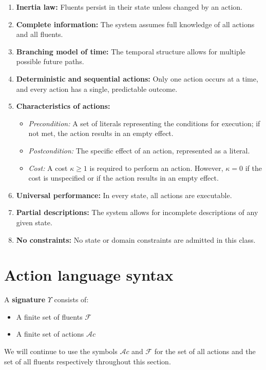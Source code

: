 \documentclass[11pt]{article}
\newcommand{\fluents}{\mathcal{F}}
\newcommand{\actions}{\mathcal{A}c}
\begin{document}
\begin{enumerate}
    \item \textbf{Inertia law:} Fluents persist in their state unless changed by an action.
    \item \textbf{Complete information:} The system assumes full knowledge of all actions and all fluents.
    \item \textbf{Branching model of time:} The temporal structure allows for multiple possible future paths.
    \item \textbf{Deterministic and sequential actions:} Only one action occurs at a time, and every action has a single, predictable outcome.
    \item \textbf{Characteristics of actions:}
    \begin{itemize}
        \item \textit{Precondition:} A set of literals representing the conditions for execution; if not met, the action results in an empty effect.
        \item \textit{Postcondition:} The specific effect of an action, represented as a literal.
        \item \textit{Cost:} A cost $\kappa \ge 1$ is required to perform an action. However, $\kappa = 0$ if the cost is unspecified or if the action results in an empty effect.
    \end{itemize}
    \item \textbf{Universal performance:} In every state, all actions are executable.
    \item \textbf{Partial descriptions:} The system allows for incomplete descriptions of any given state.
    \item \textbf{No constraints:} No state or domain constraints are admitted in this class.
\end{enumerate}

\section{Action language syntax}
\noindent A \textbf{signature} \(\Upsilon\) consists of:
\begin{itemize}
    \item A finite set of fluents $\fluents$
    \item A finite set of actions $\actions$
\end{itemize}
We will continue to use the symbols \(\actions\) and \(\fluents\) for the set of all actions and the set of all fluents respectively
throughout this section.
\end{document}
